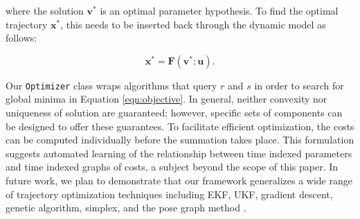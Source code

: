 \noindent where the solution ${\mathbf{v}}^{*}$ is an optimal parameter hypothesis. To find the optimal trajectory ${\mathbf{x}}^{*}$, this needs to be inserted back through the dynamic model as follows:

\begin{equation}
{\mathbf{x}}^{*} = {\mathbf{F}}\left( {{\mathbf{v}}^{*};{\mathbf{u}}} \right).
\end{equation}

Our \texttt{\small{Optimizer}} class wraps algorithms that query $r$ and $s$ in order to search for global minima in Equation \ref{eqn:objective}. In general, neither convexity nor uniqueness of solution are guaranteed; however, specific sets of components can be designed to offer these guarantees. To facilitate efficient optimization, the costs can be computed individually before the summation takes place. This formulation suggests automated learning of the relationship between time indexed parameters and time indexed graphs of costs, a subject beyond the scope of this paper. In future work, we plan to demonstrate that our framework generalizes a wide range of trajectory optimization techniques including EKF, UKF, gradient descent, genetic algorithm, simplex, and the pose graph method \cite{OlsonGraph2006}.
